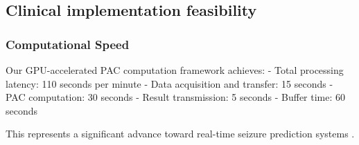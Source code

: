 


\subsection{Clinical implementation feasibility}
\subsubsection{Computational Speed}
Our GPU-accelerated PAC computation framework \cite{Combrisson2020TensorpacAOAH} achieves:
   - Total processing latency: 110 seconds per minute
     - Data acquisition and transfer: 15 seconds
     - PAC computation: 30 seconds
     - Result transmission: 5 seconds
     - Buffer time: 60 seconds

This represents a significant advance toward real-time seizure prediction systems \cite{Kuhlmann2018SeizurePA}.




\label{sec:discussion}

